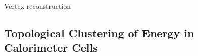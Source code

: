 Vertex reconstruction~\cite{PERF-2015-01}
















\subsection{Topological Clustering of Energy in Calorimeter Cells}

